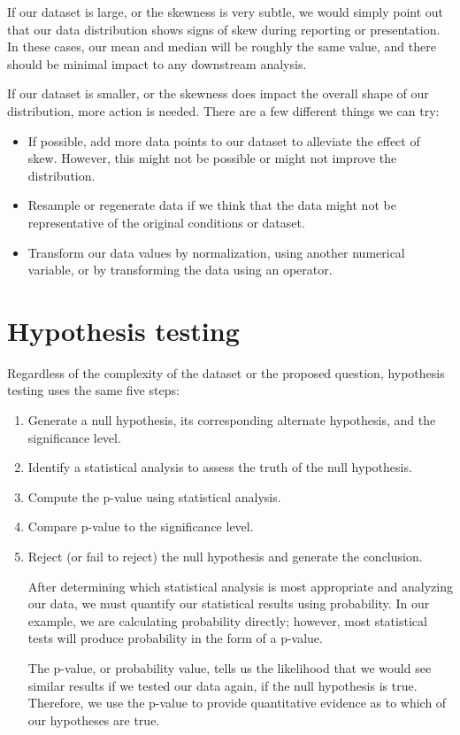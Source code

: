\documentclass[11pt]{article}
\begin{document}
If our dataset is large, or the skewness is very subtle, we would simply point out that our data distribution shows signs of skew during reporting or presentation. In these cases, our mean and median will be roughly the same value, and there should be minimal impact to any downstream analysis.

If our dataset is smaller, or the skewness does impact the overall shape of our distribution, more action is needed. There are a few different things we can try:

\begin{itemize}
\item If possible, add more data points to our dataset to alleviate the effect of skew. However, this might not be possible or might not improve the distribution.
\item Resample or regenerate data if we think that the data might not be representative of the original conditions or dataset.
\item Transform our data values by normalization, using another numerical variable, or by transforming the data using an operator.
\end{itemize}

\section{Hypothesis testing}
\label{sec:orgc048e02}

Regardless of the complexity of the dataset or the proposed question, hypothesis testing uses the same five steps:

\begin{enumerate}
\item Generate a null hypothesis, its corresponding alternate hypothesis, and the significance level.
\item Identify a statistical analysis to assess the truth of the null hypothesis.
\item Compute the p-value using statistical analysis.
\item Compare p-value to the significance level.
\item Reject (or fail to reject) the null hypothesis and generate the conclusion.

After determining which statistical analysis is most appropriate and analyzing our data, we must quantify our statistical results using probability. In our example, we are calculating probability directly; however, most statistical tests will produce probability in the form of a p-value.

The p-value, or probability value, tells us the likelihood that we would see similar results if we tested our data again, if the null hypothesis is true. Therefore, we use the p-value to provide quantitative evidence as to which of our hypotheses are true.
\end{enumerate}
\end{document}
